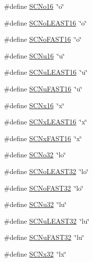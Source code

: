 \begin{DoxyCompactItemize}
\#define \hyperlink{group__avr__inttypes_ga9bc6b517c0117327e832824ff2d6a6b5}{S\+C\+No16}~\char`\"{}o\char`\"{}
\item 
\#define \hyperlink{group__avr__inttypes_ga5b05c70b4807922992a9ca529361b44d}{S\+C\+No\+L\+E\+A\+S\+T16}~\char`\"{}o\char`\"{}
\item 
\#define \hyperlink{group__avr__inttypes_ga021e130b06fc46198c71dca0fdf89788}{S\+C\+No\+F\+A\+S\+T16}~\char`\"{}o\char`\"{}
\item 
\#define \hyperlink{group__avr__inttypes_ga37bbde0e3f124b7f482d54adb13b0248}{S\+C\+Nu16}~\char`\"{}u\char`\"{}
\item 
\#define \hyperlink{group__avr__inttypes_ga7a78b92618044bb2d798b57fc6a2e439}{S\+C\+Nu\+L\+E\+A\+S\+T16}~\char`\"{}u\char`\"{}
\item 
\#define \hyperlink{group__avr__inttypes_ga7cf58abc57bb03d809e6fc41c2a40c33}{S\+C\+Nu\+F\+A\+S\+T16}~\char`\"{}u\char`\"{}
\item 
\#define \hyperlink{group__avr__inttypes_ga12dbc2ac6a36b893ef1c25c357f90a9f}{S\+C\+Nx16}~\char`\"{}x\char`\"{}
\item 
\#define \hyperlink{group__avr__inttypes_ga24647dd309d4138846376a51a6098304}{S\+C\+Nx\+L\+E\+A\+S\+T16}~\char`\"{}x\char`\"{}
\item 
\#define \hyperlink{group__avr__inttypes_ga8b67140c216180e4e5d18003038ee689}{S\+C\+Nx\+F\+A\+S\+T16}~\char`\"{}x\char`\"{}
\item 
\#define \hyperlink{group__avr__inttypes_gab561c947d62a3c7cd396d4aeef553f3c}{S\+C\+No32}~\char`\"{}lo\char`\"{}
\item 
\#define \hyperlink{group__avr__inttypes_ga6b324310e03b8ecbe6888a52b7d8581d}{S\+C\+No\+L\+E\+A\+S\+T32}~\char`\"{}lo\char`\"{}
\item 
\#define \hyperlink{group__avr__inttypes_gae40f8b90cb75998e70910e7b377288a8}{S\+C\+No\+F\+A\+S\+T32}~\char`\"{}lo\char`\"{}
\item 
\#define \hyperlink{group__avr__inttypes_gabd19a83130f8d1bd2f77b765ad804f75}{S\+C\+Nu32}~\char`\"{}lu\char`\"{}
\item 
\#define \hyperlink{group__avr__inttypes_gae30d5cc7dbc15051e21b72229a2487f7}{S\+C\+Nu\+L\+E\+A\+S\+T32}~\char`\"{}lu\char`\"{}
\item 
\#define \hyperlink{group__avr__inttypes_ga4ce14b7ebee0cfd5c4c935cf79a9a504}{S\+C\+Nu\+F\+A\+S\+T32}~\char`\"{}lu\char`\"{}
\item 
\#define \hyperlink{group__avr__inttypes_ga4c5370556f793ac7b2c3abe896dba8e2}{S\+C\+Nx32}~\char`\"{}lx\char`\"{}

\end{DoxyCompactItemize}
